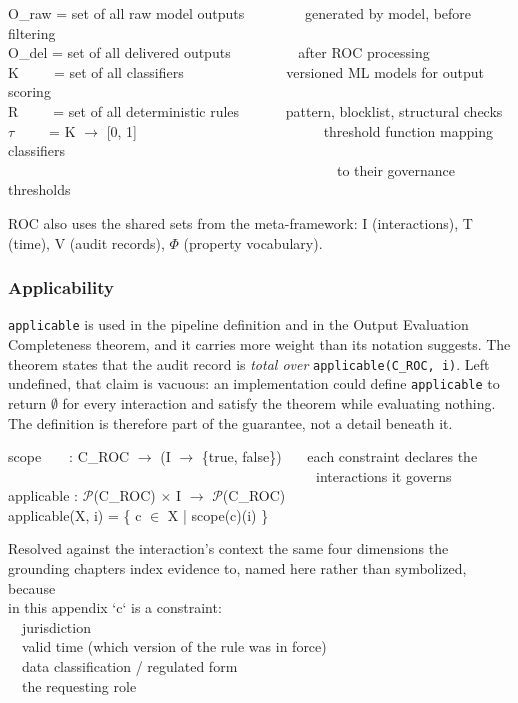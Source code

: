 \begin{cladnote}
O\_raw = set of all raw model outputs~~~~~~~~\textemdash{} generated by model, before filtering\\
O\_del = set of all delivered outputs~~~~~~~~~\textemdash{} after ROC processing\\
K~~~~~= set of all classifiers~~~~~~~~~~~~~~\textemdash{} versioned ML models for output scoring\\
R~~~~~= set of all deterministic rules~~~~~~\textemdash{} pattern, blocklist, structural checks\\
$\tau$~~~~~= K $\to$ [0, 1]~~~~~~~~~~~~~~~~~~~~~~~~~~\textemdash{} threshold function mapping classifiers\\
~~~~~~~~~~~~~~~~~~~~~~~~~~~~~~~~~~~~~~~~~~~~~~~to their governance thresholds
\end{cladnote}


ROC also uses the shared sets from the meta-framework: I (interactions), T (time), V (audit records), $\Phi$ (property vocabulary).

\subsubsection{Applicability}


\texttt{applicable} is used in the pipeline definition and in the Output Evaluation
Completeness theorem, and it carries more weight than its notation suggests. The
theorem states that the audit record is \emph{total over} \texttt{applicable(C\_\allowbreak{}ROC, i)}. Left
undefined, that claim is vacuous: an implementation could define \texttt{applicable} to
return $\emptyset$ for every interaction and satisfy the theorem while evaluating nothing.
The definition is therefore part of the guarantee, not a detail beneath it.

\begin{claddisp}
scope~~~~: C\_ROC $\to$ (I $\to$ \{true, false\})~~~\textemdash{} each constraint declares the\\
~~~~~~~~~~~~~~~~~~~~~~~~~~~~~~~~~~~~~~~~~~~~interactions it governs\\
applicable : $\mathcal{P}$(C\_ROC) $\times$ I $\to$ $\mathcal{P}$(C\_ROC)\\
applicable(X, i) = \{ c $\in$ X | scope(c)(i) \}
\par\smallskip
Resolved against the interaction's context \textemdash{} the same four dimensions the\\
grounding chapters index evidence to, named here rather than symbolized, because\\
in this appendix `c` is a constraint:\\
~~jurisdiction\\
~~valid time (which version of the rule was in force)\\
~~data classification / regulated form\\
~~the requesting role
\end{claddisp}


